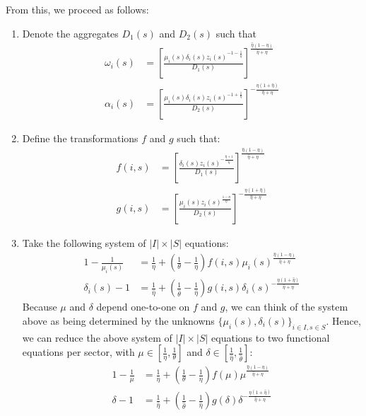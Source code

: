 \documentclass[12pt]{article}%
\begin{document}
From this, we proceed as follows: 
\begin{enumerate}
    \item Denote the aggregates $D_1(s)$ and $D_2(s)$ such that 
    \begin{align*}
        \omega_i(s) &= \left[ \frac{ \mu_i(s)\delta_i(s) z_i(s)^{-1-\frac{1}{\hat{\eta}}} }{ D_1(s) } \right]^{\frac{\hat{\eta} (1 - \eta)}{\hat{\eta} + \eta}} \\
        \alpha_i(s) &= \left[ \frac{ \mu_i(s) \delta_i(s) z_i(s)^{-1+\frac{1}{\eta}} }{ D_2(s) } \right]^{-\frac{\eta (1+\hat{\eta})}{\hat{\eta}+\eta}}
    \end{align*}

    \item Define the transformations $f$ and $g$ such that:
    \begin{align*}
        f(i,s) &= \left[ \frac{\delta_i(s) z_i(s)^{-\frac{\hat{\eta} + 1}{\hat{\eta}}} }{ D_1(s) } \right]^{\frac{\hat{\eta} (1 - \eta)}{\hat{\eta} + \eta}} \\
        g(i,s) &= \left[ \frac{\mu_i(s) z_i(s)^{\frac{1-\eta}{\eta}}}{D_2(s)} \right]^{-\frac{\eta (1+\hat{\eta})}{\hat{\eta}+\eta}}
    \end{align*}

    \item Take the following system of $|I| \times |S|$ equations:
    \begin{align}
        1 - \frac{1}{\mu_i(s)} &= \frac{1}{\eta} + (\frac{1}{\theta} - \frac{1}{\eta}) f(i,s) \mu_i(s)^{\frac{\hat{\eta} (1 - \eta)}{\hat{\eta} + \eta}} \label{markup_eq} \\
        \delta_i(s) - 1 &= \frac{1}{\hat{\eta}} + (\frac{1}{\hat{\theta}} - \frac{1}{\hat{\eta}}) g(i,s) \delta_i(s)^{-\frac{\eta (1+\hat{\eta})}{\hat{\eta}+\eta}} \label{markdown_eq}
    \end{align}
    Because $\mu$ and $\delta$ depend one-to-one on $f$ and $g$, we can think of the system above as being determined by the unknowns $\{\mu_i(s), \delta_i(s)\}_{i \in I, s \in S}$. Hence, we can reduce the above system of $|I| \times |S|$ equations to two functional equations per sector, with $\mu \in [{\frac{1}{\eta}}, \frac{1}{\theta}]$ and $\delta \in [\frac{1}{\hat{\eta}}, \frac{1}{\hat{\theta}}]$:
    \begin{align*}
        1 - \frac{1}{\mu} &= \frac{1}{\eta} + (\frac{1}{\theta} - \frac{1}{\eta})f(\mu) \mu^{\frac{\hat{\eta} (1 - \eta)}{\hat{\eta} + \eta}} \\
        \delta - 1 &= \frac{1}{\hat{\eta}} + (\frac{1}{\hat{\theta}} - \frac{1}{\hat{\eta}}) g(\delta) \delta^{-\frac{\eta (1+\hat{\eta})}{\hat{\eta}+\eta}}
    \end{align*}


\end{enumerate}
\end{document}
